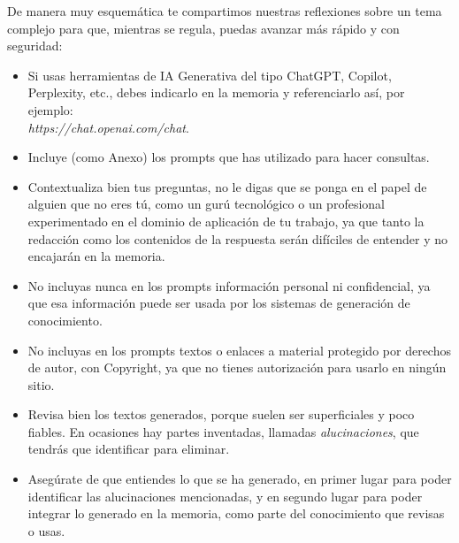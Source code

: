 De manera muy esquemática te compartimos nuestras reflexiones sobre un tema complejo para que, mientras se regula, puedas avanzar más rápido y con seguridad:

\begin{itemize}  %
    \item Si usas herramientas de IA Generativa del tipo ChatGPT, Copilot, Perplexity, etc., debes indicarlo en la memoria y referenciarlo así, por ejemplo:
    \textit{\\https://chat.openai.com/chat}.
    \item Incluye (como Anexo) los prompts que has utilizado para hacer consultas.
    \item Contextualiza bien tus preguntas, no le digas que se ponga en el papel de alguien que no eres tú, como un gurú tecnológico o un profesional experimentado en el dominio de aplicación de tu trabajo, ya que tanto la redacción como los contenidos de la respuesta serán difíciles de entender y no encajarán en la memoria.
    \item No incluyas nunca en los prompts información personal ni confidencial, ya que esa información puede ser usada por los sistemas de generación de conocimiento.
    \item No incluyas en los prompts textos o enlaces a material protegido por derechos de autor, con Copyright, ya que no tienes autorización para usarlo en ningún sitio.
    \item Revisa bien los textos generados, porque suelen ser superficiales y poco fiables. En ocasiones hay partes inventadas, llamadas \textit{alucinaciones}, que tendrás que identificar para eliminar.
    \item Asegúrate de que entiendes lo que se ha generado, en primer lugar para poder identificar las alucinaciones mencionadas, y en segundo lugar para poder integrar lo generado en la memoria, como parte del conocimiento que revisas o usas.
\end{itemize}



